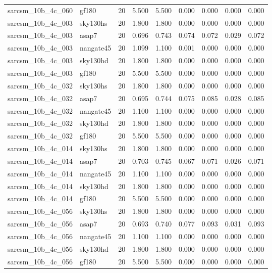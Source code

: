 \begin{tabular}{llrrrrrrr}
sarcsm\_10b\_4c\_060 & gf180 & 20 & 5.500 & 5.500 & 0.000 & 0.000 & 0.000 & 0.000 \\
sarcsm\_10b\_4c\_003 & sky130hs & 20 & 1.800 & 1.800 & 0.000 & 0.000 & 0.000 & 0.000 \\
sarcsm\_10b\_4c\_003 & asap7 & 20 & 0.696 & 0.743 & 0.074 & 0.072 & 0.029 & 0.072 \\
sarcsm\_10b\_4c\_003 & nangate45 & 20 & 1.099 & 1.100 & 0.001 & 0.000 & 0.000 & 0.000 \\
sarcsm\_10b\_4c\_003 & sky130hd & 20 & 1.800 & 1.800 & 0.000 & 0.000 & 0.000 & 0.000 \\
sarcsm\_10b\_4c\_003 & gf180 & 20 & 5.500 & 5.500 & 0.000 & 0.000 & 0.000 & 0.000 \\
sarcsm\_10b\_4c\_032 & sky130hs & 20 & 1.800 & 1.800 & 0.000 & 0.000 & 0.000 & 0.000 \\
sarcsm\_10b\_4c\_032 & asap7 & 20 & 0.695 & 0.744 & 0.075 & 0.085 & 0.028 & 0.085 \\
sarcsm\_10b\_4c\_032 & nangate45 & 20 & 1.100 & 1.100 & 0.000 & 0.000 & 0.000 & 0.000 \\
sarcsm\_10b\_4c\_032 & sky130hd & 20 & 1.800 & 1.800 & 0.000 & 0.000 & 0.000 & 0.000 \\
sarcsm\_10b\_4c\_032 & gf180 & 20 & 5.500 & 5.500 & 0.000 & 0.000 & 0.000 & 0.000 \\
sarcsm\_10b\_4c\_014 & sky130hs & 20 & 1.800 & 1.800 & 0.000 & 0.000 & 0.000 & 0.000 \\
sarcsm\_10b\_4c\_014 & asap7 & 20 & 0.703 & 0.745 & 0.067 & 0.071 & 0.026 & 0.071 \\
sarcsm\_10b\_4c\_014 & nangate45 & 20 & 1.100 & 1.100 & 0.000 & 0.000 & 0.000 & 0.000 \\
sarcsm\_10b\_4c\_014 & sky130hd & 20 & 1.800 & 1.800 & 0.000 & 0.000 & 0.000 & 0.000 \\
sarcsm\_10b\_4c\_014 & gf180 & 20 & 5.500 & 5.500 & 0.000 & 0.000 & 0.000 & 0.000 \\
sarcsm\_10b\_4c\_056 & sky130hs & 20 & 1.800 & 1.800 & 0.000 & 0.000 & 0.000 & 0.000 \\
sarcsm\_10b\_4c\_056 & asap7 & 20 & 0.693 & 0.740 & 0.077 & 0.093 & 0.031 & 0.093 \\
sarcsm\_10b\_4c\_056 & nangate45 & 20 & 1.100 & 1.100 & 0.000 & 0.000 & 0.000 & 0.000 \\
sarcsm\_10b\_4c\_056 & sky130hd & 20 & 1.800 & 1.800 & 0.000 & 0.000 & 0.000 & 0.000 \\
sarcsm\_10b\_4c\_056 & gf180 & 20 & 5.500 & 5.500 & 0.000 & 0.000 & 0.000 & 0.000 \\

\end{tabular}
